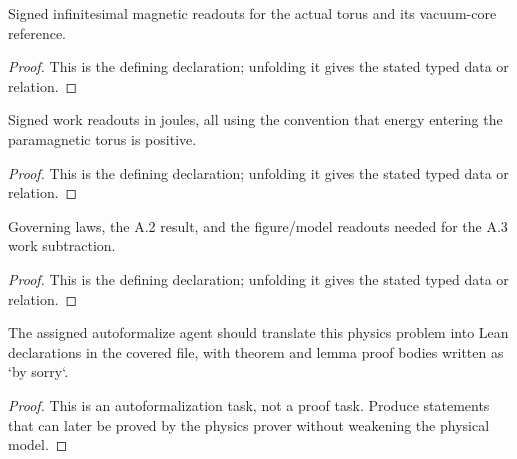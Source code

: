 \begin{definition}[UniformMagneticIncrement]
  \label{decl:physics:IPhO_2026_3_A_3:UniformMagneticIncrement}
  Signed infinitesimal magnetic readouts for the actual torus and its vacuum-core reference.
\end{definition}
\begin{proof}
  This is the defining declaration; unfolding it gives the stated typed data or relation.
\end{proof}

\begin{definition}[WorkIncrementReadouts]
  \label{decl:physics:IPhO_2026_3_A_3:WorkIncrementReadouts}
  Signed work readouts in joules, all using the convention that energy entering the paramagnetic torus is positive.
\end{definition}
\begin{proof}
  This is the defining declaration; unfolding it gives the stated typed data or relation.
\end{proof}

\begin{definition}[SatisfiesWorkModel]
  \label{decl:physics:IPhO_2026_3_A_3:SatisfiesWorkModel}
  Governing laws, the A.2 result, and the figure/model readouts needed for the A.3 work subtraction.
\end{definition}
\begin{proof}
  This is the defining declaration; unfolding it gives the stated typed data or relation.
\end{proof}

\begin{theorem}
\label{thm:physics:IPhO_2026_3_A_3:target}
The assigned autoformalize agent should translate this physics problem into Lean declarations in the covered file, with theorem and lemma proof bodies written as `by sorry`.
\end{theorem}
\begin{proof}
This is an autoformalization task, not a proof task. Produce statements that can later be proved by the physics prover without weakening the physical model.
\end{proof}
